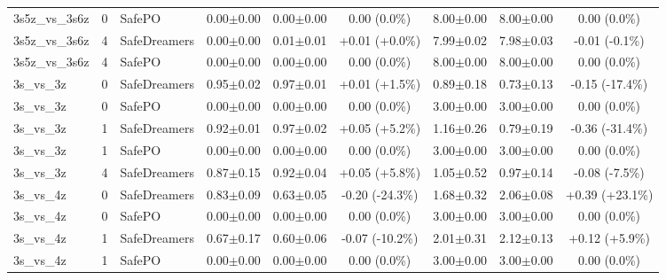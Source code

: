 \documentclass{article}
\begin{document}
\begin{longtable}{lclcccccc}
3s5z\_vs\_3s6z & 0 & SafePO & 0.00$\pm$0.00 & 0.00$\pm$0.00 & \textcolor{red!40!black}{0.00 (0.0\%)} & 8.00$\pm$0.00 & 8.00$\pm$0.00 & \textcolor{green!40!black}{0.00 (0.0\%)} \\
3s5z\_vs\_3s6z & 4 & SafeDreamers & 0.00$\pm$0.00 & 0.01$\pm$0.01 & \textcolor{green!40!black}{+0.01 (+0.0\%)} & 7.99$\pm$0.02 & 7.98$\pm$0.03 & \textcolor{green!40!black}{-0.01 (-0.1\%)} \\
3s5z\_vs\_3s6z & 4 & SafePO & 0.00$\pm$0.00 & 0.00$\pm$0.00 & \textcolor{red!40!black}{0.00 (0.0\%)} & 8.00$\pm$0.00 & 8.00$\pm$0.00 & \textcolor{green!40!black}{0.00 (0.0\%)} \\
\midrule
3s\_vs\_3z & 0 & SafeDreamers & 0.95$\pm$0.02 & 0.97$\pm$0.01 & \textcolor{green!40!black}{+0.01 (+1.5\%)} & 0.89$\pm$0.18 & 0.73$\pm$0.13 & \textcolor{green!70!black}{-0.15 (-17.4\%)} \\
3s\_vs\_3z & 0 & SafePO & 0.00$\pm$0.00 & 0.00$\pm$0.00 & \textcolor{red!40!black}{0.00 (0.0\%)} & 3.00$\pm$0.00 & 3.00$\pm$0.00 & \textcolor{green!40!black}{0.00 (0.0\%)} \\
3s\_vs\_3z & 1 & SafeDreamers & 0.92$\pm$0.01 & 0.97$\pm$0.02 & \textcolor{green!55!black}{+0.05 (+5.2\%)} & 1.16$\pm$0.26 & 0.79$\pm$0.19 & \textcolor{green!85!black}{-0.36 (-31.4\%)} \\
3s\_vs\_3z & 1 & SafePO & 0.00$\pm$0.00 & 0.00$\pm$0.00 & \textcolor{red!40!black}{0.00 (0.0\%)} & 3.00$\pm$0.00 & 3.00$\pm$0.00 & \textcolor{green!40!black}{0.00 (0.0\%)} \\
3s\_vs\_3z & 4 & SafeDreamers & 0.87$\pm$0.15 & 0.92$\pm$0.04 & \textcolor{green!55!black}{+0.05 (+5.8\%)} & 1.05$\pm$0.52 & 0.97$\pm$0.14 & \textcolor{green!55!black}{-0.08 (-7.5\%)} \\
\midrule
3s\_vs\_4z & 0 & SafeDreamers & 0.83$\pm$0.09 & 0.63$\pm$0.05 & \textcolor{red!70!black}{-0.20 (-24.3\%)} & 1.68$\pm$0.32 & 2.06$\pm$0.08 & \textcolor{red!70!black}{+0.39 (+23.1\%)} \\
3s\_vs\_4z & 0 & SafePO & 0.00$\pm$0.00 & 0.00$\pm$0.00 & \textcolor{red!40!black}{0.00 (0.0\%)} & 3.00$\pm$0.00 & 3.00$\pm$0.00 & \textcolor{green!40!black}{0.00 (0.0\%)} \\
3s\_vs\_4z & 1 & SafeDreamers & 0.67$\pm$0.17 & 0.60$\pm$0.06 & \textcolor{red!55!black}{-0.07 (-10.2\%)} & 2.01$\pm$0.31 & 2.12$\pm$0.13 & \textcolor{red!55!black}{+0.12 (+5.9\%)} \\
3s\_vs\_4z & 1 & SafePO & 0.00$\pm$0.00 & 0.00$\pm$0.00 & \textcolor{red!40!black}{0.00 (0.0\%)} & 3.00$\pm$0.00 & 3.00$\pm$0.00 & \textcolor{green!40!black}{0.00 (0.0\%)} \\

\end{longtable}
\end{document}
